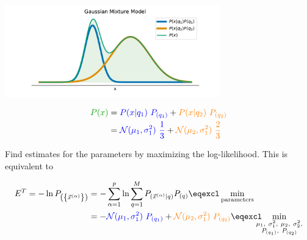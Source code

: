 \begin{frame} 

\pause

\begin{center}
	\includegraphics[width=0.7\textwidth]{img/gmm}
	\label{fig:gmmexample}
\end{center}

\pause


\svspace{-11mm}

\begin{align}
{\color{darkgreen}P(x)} &= {\color{blue}P(x|q_1)~P_{(q_1)}} + {\color{orange}P(x|q_2)~P_{(q_2)}}\\
&= {\color{blue}\mathcal{N}(\mu_1, \sigma^2_1)~\frac{1}{3}} + {\color{orange}\mathcal{N}(\mu_2, \sigma^2_1)~\frac{2}{3}}
\end{align}

\pause

Find estimates for the parameters by maximizing the log-likelihood. This is equivalent to

\svspace{-7mm}

\begin{align}
E^T = - \ln P_{\left( \left\{ \vec{x}^{(\alpha)} \right\} \right)} &= - \sum_{\alpha=1}^{p} \ln \sum_{q=1}^{M} P_{(\vec{x}^{(\alpha)} | q)} P_{(q)} \eqexcl \min_{\text{parameters}}\\
&= - {\color{blue}\mathcal{N}(\mu_1, \sigma^2_1)~P_{(q_1)}} + {\color{orange}\mathcal{N}(\mu_2, \sigma^2_1)~P_{(q_2)}}
\eqexcl
\kern-2ex
\min_{\substack{
\mu_1,~\sigma^2_1,~\mu_2,~\sigma^2_2,\\ P_{(q_1)},~P_{(q_2)}}}
\end{align}

\end{frame}

